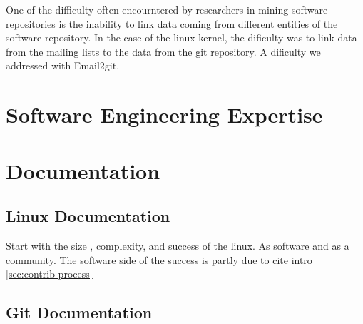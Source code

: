 One of the difficulty often encourntered by researchers in mining software repositories is the inability to link data coming from different entities of the software repository. In the case of the linux kernel, the dificulty was to link data from the mailing lists to the data from the git repository. A dificulty we addressed with Email2git.



\section{Software Engineering Expertise}
\label{sec:expertise_models}




\section{Documentation}




\subsection{Linux Documentation}

Start with the size , complexity, and success of the linux. As software and as a community. The software side of the success is partly due to 
cite intro \autoref{sec:contrib-process}


\subsection{Git Documentation}
